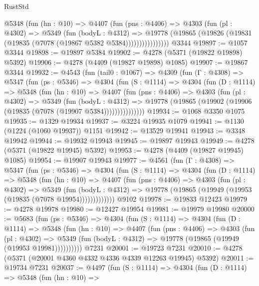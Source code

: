 \begin{lexlean}{RustStd}
\begin{coremodule}
{\begin{coremodule}
{{{{{{{{{{{{{{{{{{{{{{{{{{{{{{{{{{{              @5348
                (fun (hn : @10) =>
                @4407
                  (fun (pns : @4406) =>
                  @4303
                    (fun (pl : @4302) =>
                    @5349
                      (fun (bodyL : @4312) =>
                      @19778
                        (@19865 (@19826 (@19831 (@19835 (@7078 (@19867 @5382 @5384))))))))))))))))
    @3344
@19897 := @1057 @3344
@19898 := @19897 @5384
@19902 := @4278 (@5371 (@19822 @19898) @5392)
@19906 := @4278 (@4409 (@19827 @19898) @1085)
@19907 := @19867 @3344
@19932 := @4543
    (fun (tail0 : @1067) =>
    @4309
      (fun (Γ : @4308) =>
      @5347
        (fun (ps : @5346) =>
        @4304
          (fun (S : @1114) =>
          @4304
            (fun (D : @1114) =>
            @5348
              (fun (hn : @10) =>
              @4407
                (fun (pns : @4406) =>
                @4303
                  (fun (pl : @4302) =>
                  @5349
                    (fun (bodyL : @4312) =>
                    @19778 (@19865 (@19902 (@19906 (@19835 (@7078 (@19907 @5384)))))))))))))))
@19934 := @1068 @3350 @1075
@19935 := @1329 @19934
@19937 := @3224 @19935 @1079
@19941 := @1130 (@1224 (@1060 @19937)) @1151
@19942 := @13529 @19941
@19943 := @3348 @19942
@19944 := @19932 @19943
@19945 := @19897 @19943
@19949 := @4278 (@5371 (@19822 @19945) @5392)
@19953 := @4278 (@4409 (@19827 @19945) @1085)
@19954 := @19907 @19943
@19977 := @4561
    (fun (Γ : @4308) =>
    @5347
      (fun (ps : @5346) =>
      @4304
        (fun (S : @1114) =>
        @4304
          (fun (D : @1114) =>
          @5348
            (fun (hn : @10) =>
            @4407
              (fun (pns : @4406) =>
              @4303
                (fun (pl : @4302) =>
                @5349
                  (fun (bodyL : @4312) =>
                  @19778 (@19865 (@19949 (@19953 (@19835 (@7078 @19954)))))))))))))
    @9102
@19978 := @19833 @12423
@19979 := @4278 @19978
@19980 := @12427 @19954
@19981 := @19979 @19980
@20000 := @5683
    (fun (ps : @5346) =>
    @4304
      (fun (S : @1114) =>
      @4304
        (fun (D : @1114) =>
        @5348
          (fun (hn : @10) =>
          @4407
            (fun (pns : @4406) =>
            @4303
              (fun (pl : @4302) =>
              @5349 (fun (bodyL : @4312) => @19778 (@19865 (@19949 (@19953 @19981))))))))))
    @7231
@20001 := @19723 @7231
@20010 := @4278 (@5371 (@20001 @4360 @4332 @4336 @4339 @12263 @19945) @5392)
@20011 := @19734 @7231
@20037 := @4497
    (fun (S : @1114) =>
    @4304
      (fun (D : @1114) =>
      @5348
        (fun (hn : @10) =>
}}}}}}}}}}}}}}}}}}}}}}}}}}}}}}}}}}}
\end{coremodule}}
\end{coremodule}
\end{lexlean}
